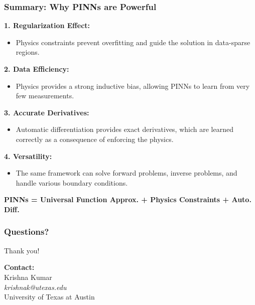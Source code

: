 \documentclass[notes]{beamer}
\begin{document}
\begin{frame}
\frametitle{Summary: Why PINNs are Powerful}

\textbf{1. Regularization Effect:}
\begin{itemize}
    \item Physics constraints prevent overfitting and guide the solution in data-sparse regions.
\end{itemize}

\textbf{2. Data Efficiency:}
\begin{itemize}
    \item Physics provides a strong inductive bias, allowing PINNs to learn from very few measurements.
\end{itemize}

\textbf{3. Accurate Derivatives:}
\begin{itemize}
    \item Automatic differentiation provides exact derivatives, which are learned correctly as a consequence of enforcing the physics.
\end{itemize}

\textbf{4. Versatility:}
\begin{itemize}
    \item The same framework can solve forward problems, inverse problems, and handle various boundary conditions.
\end{itemize}

\begin{center}
\textbf{PINNs = Universal Function Approx. + Physics Constraints + Auto. Diff.}
\end{center}

\end{frame}

\begin{frame}
\frametitle{Questions?}

\centering
\Large Thank you!

\vspace{2cm}

\textbf{Contact:} \\
Krishna Kumar \\
\textit{krishnak@utexas.edu} \\
University of Texas at Austin

\end{frame}
\end{document}

